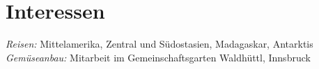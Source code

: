 \documentclass[a4paper]{twentysecondcv} %
\begin{document}
\vspace*{0.7em}



\section{Interessen}

\emph{Reisen: } Mittelamerika, Zentral und S\"udostasien, Madagaskar, Antarktis\\
\emph{Gem\"useanbau: } Mitarbeit im Gemeinschaftsgarten Waldh\"uttl, Innsbruck\
\end{document}
